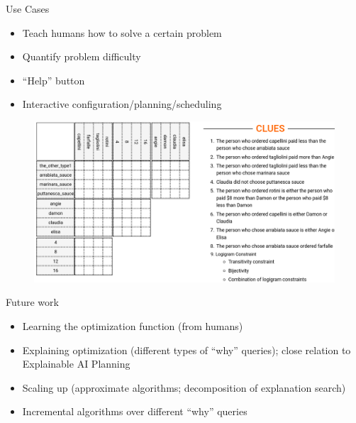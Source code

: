 \documentclass{beamer}
\begin{document}
	\begin{frame}{Use Cases}
	\begin{minipage}{0.6\textwidth}
		 \begin{itemize}
			\item Teach humans how to solve a certain problem
			\item Quantify problem difficulty
			\item ``Help'' button
			\item Interactive configuration/planning/scheduling
		\end{itemize}
		
	\end{minipage}
	\begin{minipage}{0.39\textwidth}
		\begin{figure}
			\includegraphics[width=\textwidth]{figures/logic_puzzle.png}
		\end{figure}
	\end{minipage}

	
	
\end{frame}

	\begin{frame}{Future work}

\begin{itemize}
	\item Learning the optimization function (from humans)
	\item Explaining optimization (different types of ``why'' queries); close relation to Explainable AI Planning \cite{fox2017explainable}
	\item Scaling up (approximate algorithms; decomposition of explanation search)
	\item Incremental algorithms over different ``why'' queries
\end{itemize}	
	
	
\end{frame}
\end{document}
